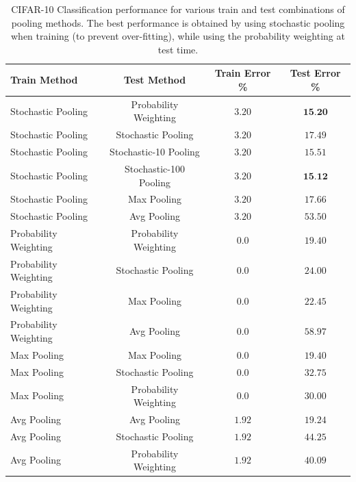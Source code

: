 \documentclass{article} %
\begin{document}
\begin{table}[h!]
\small
\vspace*{-3mm}
\begin{center}
\begin{tabular}{|l|c|c|c|}
  \hline
  Train Method & Test Method & Train Error \% & Test Error \% \\
  \hline\hline
  Stochastic Pooling & Probability Weighting & $3.20$ & $\textbf{15.20}$ \\
  Stochastic Pooling & Stochastic Pooling & $3.20$ & $17.49$ \\
  Stochastic Pooling & Stochastic-10 Pooling & $3.20$ & $15.51$ \\
  Stochastic Pooling & Stochastic-100 Pooling & $3.20$ & $\textbf{15.12}$ \\
  Stochastic Pooling & Max Pooling & $3.20$ & $17.66$ \\ %
  Stochastic Pooling & Avg Pooling & $3.20$ & $53.50$ \\ %
  \hline\hline %
  Probability Weighting & Probability Weighting & $0.0$ & $19.40$ \\
  Probability Weighting & Stochastic Pooling & $0.0$ & $24.00$ \\
  Probability Weighting & Max Pooling & $0.0$ & $22.45$ \\
  Probability Weighting & Avg Pooling & $0.0$ & $58.97$ \\
  \hline\hline %
  Max Pooling & Max Pooling & $0.0$ & $19.40$ \\
  Max Pooling & Stochastic Pooling & $0.0$ & $32.75$ \\
  Max Pooling & Probability Weighting & $0.0$ & $30.00$ \\
  \hline\hline %
  Avg Pooling & Avg Pooling & $1.92$ & $19.24$ \\
  Avg Pooling & Stochastic Pooling & $1.92$ & $44.25$ \\
  Avg Pooling & Probability Weighting & $1.92$ & $40.09$ \\
  \hline
\end{tabular}
\vspace*{-2mm}
\caption{CIFAR-10 Classification performance for various train and
  test combinations of pooling methods. The best performance is
  obtained by using stochastic pooling when training (to prevent
  over-fitting), while using the probability weighting at test time.}
\label{tab:combos}
\end{center}
\vspace*{-9mm}
\end{table}
\end{document}
